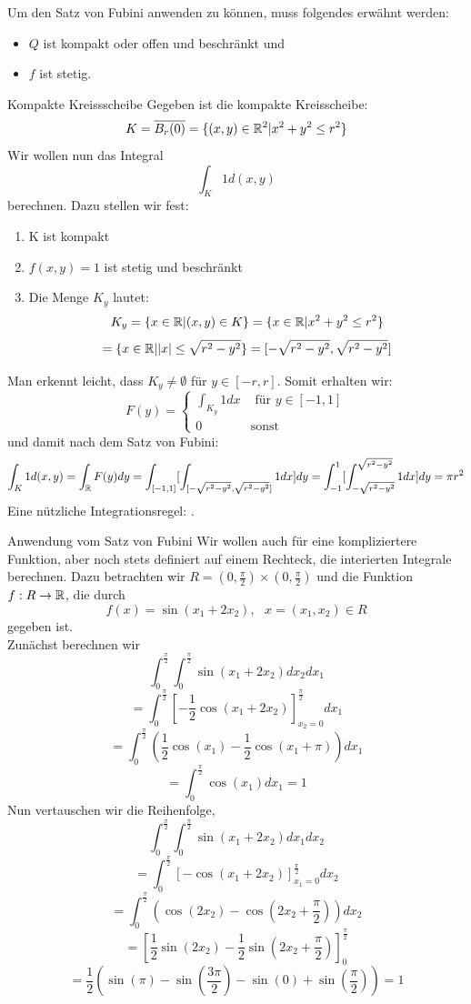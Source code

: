  Um den Satz von Fubini anwenden zu können, muss folgendes erwähnt werden:
\begin{itemize}
    \item $Q$ ist kompakt oder offen und beschränkt und
    \item $f$ ist stetig.
\end{itemize}
\begin{Beispiel}{Kompakte Kreissscheibe}
    Gegeben ist die kompakte Kreisscheibe:
    $$K=\overline{B_r(0)}=\{(x,y)\in\mathbb{R}^2| x^2+y^2\leq r^2\}$$
    Wir wollen nun das Integral
    $$\int_K 1 d(x,y)$$
    berechnen. Dazu stellen wir fest:
    \begin{enumerate}
        \item K ist kompakt
        \item $f(x,y)= 1$ ist stetig und beschränkt
        \item Die Menge $K_y$ lautet:
        $$K_y=\{x\in \mathbb{R}| (x,y)\in K\}=\{ x\in \mathbb{R} | x^2+y^2 \leq r^2\}$$
        $$= \{x\in \mathbb{R} | |x| \leq \sqrt{r^2-y^2}\}=[-\sqrt{r^2-y^2}, \sqrt{r^2-y^2}]$$
    \end{enumerate}
    Man erkennt leicht, dass $K_y\neq \emptyset$ für $y\in [-r, r]$. Somit erhalten wir:
    \begin{equation}
        F(y)=\begin{cases}\int_{K_y} 1dx & \mbox{ für $y\in [-1, 1]$} \\0 & \mbox{sonst}\end{cases}
    \end{equation}
    und damit nach dem Satz von Fubini:
    $$\int_K 1 d(x,y) = \int_{\mathbb{R}} F(y) dy = \int_{[-1,1]}[\int_{[-\sqrt{r^2-y^2}, \sqrt{r^2-y^2}]} 1dx]dy= \int_{-1}^{1} [\int_{-\sqrt{r^2-y^2}}^{\sqrt{r^2-y^2}} 1dx]dy=\pi r^2$$
    Eine nützliche Integrationsregel: .
\end{Beispiel}
\begin{Beispiel}{Anwendung vom Satz von Fubini}
Wir wollen auch für eine kompliziertere Funktion, aber noch stets definiert auf einem Rechteck, die interierten Integrale berechnen. Dazu betrachten wir $R=(0,\frac{\pi}{2})\times (0,\frac{\pi}{2})$ und die Funktion $f:R\rightarrow \mathbb{R}$, die durch
$$f(x)=\sin(x_1+2x_2), \mbox{ $x=(x_1,x_2)\in R$}$$
gegeben ist. \\
Zunächst berechnen wir
$$\int_0^{\frac{\pi}{2}}\int_0^{\frac{\pi}{2}} \sin(x_1+2x_2)dx_2dx_1$$
$$=\int_0^{\frac{\pi}{2}}[-\frac{1}{2}\cos(x_1+2x_2)]^{\frac{\pi}{2}}_{x_2=0}dx_1$$
$$=\int_0^{\frac{\pi}{2}}(\frac{1}{2}\cos(x_1)-\frac{1}{2}\cos(x_1+\pi))dx_1$$
$$=\int_0^{\frac{\pi}{2}}\cos(x_1)dx_1 = 1$$
Nun vertauschen wir die Reihenfolge,
$$\int_0^{\frac{\pi}{2}}\int_0^{\frac{\pi}{2}} \sin(x_1+2x_2)dx_1dx_2$$
$$=\int_0^{\frac{\pi}{2}} [-\cos(x_1+2x_2)]^{\frac{\pi}{2}}_{x_1=0}dx_2$$
$$=\int_0^{\frac{\pi}{2}} (\cos(2x_2)-\cos(2x_2+\frac{\pi}{2}))dx_2$$
$$=[\frac{1}{2}\sin(2x_2)-\frac{1}{2}\sin(2x_2+\frac{\pi}{2})]_0^{\frac{\pi}{2}}$$
$$=\frac{1}{2}(\sin(\pi)-\sin(\frac{3\pi}{2})-\sin(0)+\sin(\frac{\pi}{2})) = 1$$
\end{Beispiel}
